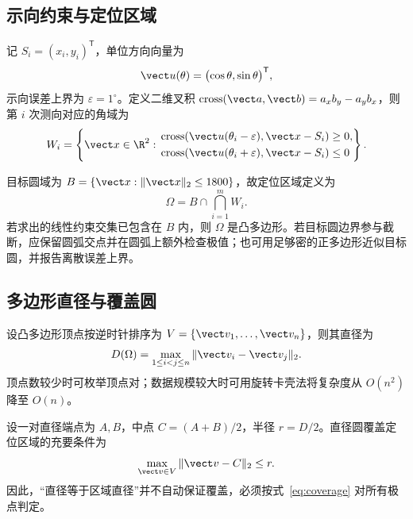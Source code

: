 \subsection{示向约束与定位区域}

记 \(S_i=(x_i,y_i)^{\mathsf T}\)，单位方向向量为
\begin{equation}
  \vect u(\theta)=\bigl(\cos\theta,\sin\theta\bigr)^{\mathsf T},
\end{equation}
示向误差上界为 \(\varepsilon=1^{\circ}\)。定义二维叉积
\(\operatorname{cross}(\vect a,\vect b)=a_xb_y-a_yb_x\)，则第 \(i\) 次测向对应的角域为
\begin{equation}
  W_i=\left\{\vect x\in\R^2:
  \begin{aligned}
  &\operatorname{cross}\!\left(\vect u(\theta_i-\varepsilon),\vect x-S_i\right)\ge 0,\\
  &\operatorname{cross}\!\left(\vect u(\theta_i+\varepsilon),\vect x-S_i\right)\le 0
  \end{aligned}\right\}.
  \label{eq:wedge}
\end{equation}

目标圆域为 \(B=\{\vect x:\|\vect x\|_2\le1800\}\)，故定位区域定义为
\begin{equation}
  \Omega=B\cap\bigcap_{i=1}^{m}W_i.
  \label{eq:location-region}
\end{equation}
若求出的线性约束交集已包含在 \(B\) 内，则 \(\Omega\) 是凸多边形。若目标圆边界参与截断，应保留圆弧交点并在圆弧上额外检查极值；也可用足够密的正多边形近似目标圆，并报告离散误差上界。

\subsection{多边形直径与覆盖圆}

设凸多边形顶点按逆时针排序为 \(V=\{\vect v_1,\ldots,\vect v_n\}\)，则其直径为
\begin{equation}
  D(\Omega)=\max_{1\le i<j\le n}\|\vect v_i-\vect v_j\|_2.
  \label{eq:diameter}
\end{equation}
顶点数较少时可枚举顶点对；数据规模较大时可用旋转卡壳法将复杂度从 \(O(n^2)\) 降至 \(O(n)\)。

设一对直径端点为 \(A,B\)，中点 \(C=(A+B)/2\)，半径 \(r=D/2\)。直径圆覆盖定位区域的充要条件为
\begin{equation}
  \max_{\vect v\in V}\|\vect v-C\|_2\le r.
  \label{eq:coverage}
\end{equation}
因此，“直径等于区域直径”并不自动保证覆盖，必须按式~\eqref{eq:coverage} 对所有极点判定。
